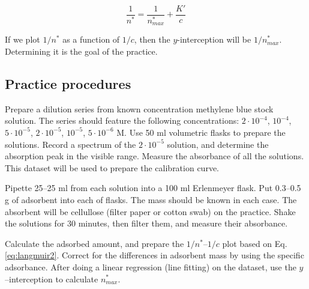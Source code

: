 \begin{equation}
\label{eq:langmuir2}
        \frac{1}{n^*}
        =
        \frac{1}{n^*_{max}}
	+
	\frac{K'}{c}
\end{equation}

If we plot $1/n^*$ as a function of $1/c$, then the $y$-interception will be $1/n^*_{max}$. Determining it is the goal of the practice.

\subsection{Practice procedures}

Prepare a dilution series from known concentration methylene blue stock solution. The series should feature the following concentrations: $2\cdot10^{-4}$, $10^{-4}$, $5\cdot10^{-5}$, $2\cdot10^{-5}$, $10^{-5}$, $5\cdot10^{-6}$ M. Use 50 ml volumetric flasks to prepare the solutions. Record a spectrum of the $2\cdot10^{-5}$ solution, and determine the absorption peak in the visible range. Measure the absorbance of all the solutions. This dataset will be used to prepare the calibration curve.

Pipette 25--25 ml from each solution into a 100 ml Erlenmeyer flask. Put 0.3--0.5 g of adsorbent into each of flasks. The mass should be known in each case. The absorbent will be cellullose (filter paper or cotton swab) on the practice.
Shake the solutions for 30 minutes, then filter them, and measure their absorbance.

Calculate the adsorbed amount, and prepare the $1/n^*$--$1/c$ plot based on Eq. \ref{eq:langmuir2}. Correct for the differences in adsorbent mass by using the specific adsorbance.
After doing a linear regression (line fitting) on the dataset, use the $y$--interception to calculate $n^*_{max}$. 

